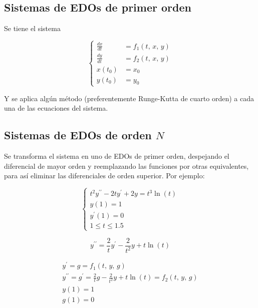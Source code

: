 \documentclass{article}
\begin{document}
\subsection{Sistemas de EDOs de primer orden}

Se tiene el sistema

\begin{equation*}
\begin{cases}
    \frac{dx}{dt} &= f_1(t,\,x,\,y) \\
    \frac{dy}{dt} &= f_2(t,\,x,\,y) \\
    x(t_0) &= x_0 \\
    y(t_0) &= y_0
\end{cases}
\end{equation*}

Y se aplica algún método (preferentemente Runge-Kutta de cuarto orden) a cada
una de las ecuaciones del sistema.

\subsection{Sistemas de EDOs de orden $N$}

Se transforma el sistema en uno de EDOs de primer orden, despejando el 
diferencial de mayor orden y reemplazando las funciones por otras equivalentes,
para así eliminar las diferenciales de orden superior. Por ejemplo:

\begin{equation*}
\begin{cases}
    t^2 y^{\prime\prime} - 2ty^\prime + 2y = t^3\ln(t) \\
    y(1) = 1 \\
    y^\prime(1) = 0 \\
    1 \leq t \leq 1.5
\end{cases}
\end{equation*}

\begin{equation*}
    y^{\prime\prime} = \frac{2}{t}y^\prime - \frac{2}{t^2}y + t\ln(t)
\end{equation*}

\begin{align*}
    y^\prime = g = f_1(t,\,y,\,g) \\
    y^{\prime\prime} = g^\prime = \frac{2}{t}g - \frac{2}{t^2}y + t\ln(t) 
    = f_2(t,\,y,\,g) \\
    y(1) = 1 \\
    g(1) = 0
\end{align*}
\end{document}
